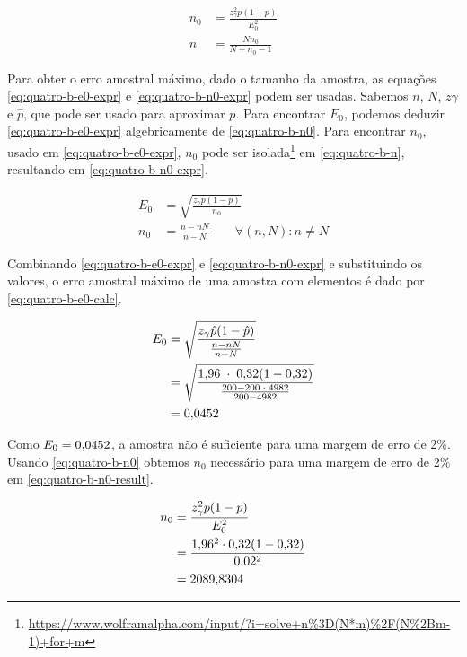 	\begin{align}
		n_0 &= \label{eq:quatro-b-n0}
			   \frac{z_\gamma^2 p(1-p)}{E_0^2} \\
		n &= \label{eq:quatro-b-n}
			 \frac{N n_0}{N + n_0 - 1} 
	\end{align}

	Para obter o erro amostral máximo, dado o tamanho da amostra, as
	equações \eqref{eq:quatro-b-e0-expr} e \eqref{eq:quatro-b-n0-expr} podem
	ser usadas. Sabemos $n$, $N$, $z\gamma$ e $\hat{p}$, que pode ser usado para
	aproximar $p$. Para encontrar $E_0$, podemos deduzir
	\eqref{eq:quatro-b-e0-expr} algebricamente de \eqref{eq:quatro-b-n0}.
	Para encontrar $n_0$, usado em \eqref{eq:quatro-b-e0-expr}, $n_0$ pode
	ser isolada\footnote{\url{https://www.wolframalpha.com/input/?i=solve+n\%3D(N*m)\%2F(N\%2Bm-1)+for+m}}
    em \eqref{eq:quatro-b-n}, resultando em
	\eqref{eq:quatro-b-n0-expr}. 

	\begin{align}
		E_0 &= \label{eq:quatro-b-e0-expr}
			   \sqrt{\frac{z_\gamma p(1 - p) }{n_0}} \\
		n_0 &= \label{eq:quatro-b-n0-expr}
			   \frac{n-n N}{n-N} \qquad \forall (n, N) : n \neq N
	\end{align}

	Combinando \eqref{eq:quatro-b-e0-expr} e \eqref{eq:quatro-b-n0-expr} e
	substituindo os valores, o erro amostral máximo de uma amostra com
	\QUATROn elementos é dado por \eqref{eq:quatro-b-e0-calc}.

	\begin{align}
		\label{eq:quatro-b-e0-calc}
		E_0 &= \sqrt{\frac{z_\gamma \hat{p}(1 - \hat{p}) }{\frac{n-n N}{n - N}}} \\
			&= \sqrt{\frac{\num{1.96} \;\cdot\; \num{0.32} (1 - \num{0.32}) }{\frac{200 - 200 \;\cdot\; 4982}{200 - 4982}}} \nonumber \\
			&= \num{0.0452} \nonumber
	\end{align}

	Como $E_0 = \num{0.0452}$, a amostra não é suficiente para uma margem de
	erro de 2\%. Usando \eqref{eq:quatro-b-n0} obtemos $n_0$ necessário para
	uma margem de erro de 2\% em \eqref{eq:quatro-b-n0-result}.

	\begin{align}
		n_0 &= \frac{z_\gamma^2 p(1-p)}{E_0^2} \nonumber \\
			&= \frac{\num{1.96}^2 \cdot \num{0.32}(1-\num{0.32})}{\num{0.02}^2} \nonumber \\
			&= \label{eq:quatro-b-n0-result}
			   \num{2089.8304}	
	\end{align}

